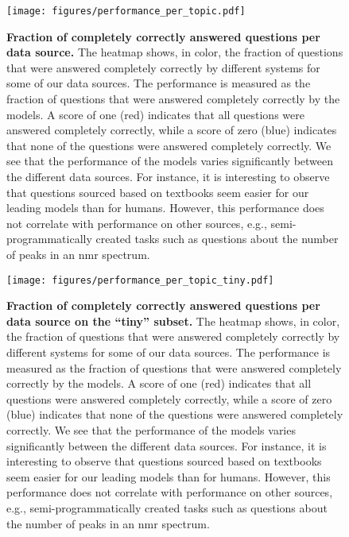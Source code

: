 \begin{figure}[htb]
    \centering
    \texttt{[image: figures/performance\_per\_topic.pdf]}
    \caption{\textbf{Fraction of completely correctly answered questions per data source.} The heatmap shows, in color, the fraction of questions that were answered completely correctly by different systems for some of our data sources. The performance is measured as the fraction of questions that were answered completely correctly by the models. A score of one (red) indicates that all questions were answered completely correctly, while a score of zero (blue) indicates that none of the questions were answered completely correctly.
        We see that the performance of the models varies significantly between the different data sources. For instance, it is interesting to observe that questions sourced based on textbooks seem easier for our leading models than for humans. However, this performance does not correlate with performance on other sources, e.g., semi-programmatically created tasks such as questions about the number of peaks in an \gls{nmr} spectrum.
    }
    \label{fig:performance_per_topic}
\end{figure}



\begin{figure}[htb]
    \centering
    \texttt{[image: figures/performance\_per\_topic\_tiny.pdf]}
    \caption{\textbf{Fraction of completely correctly answered questions per data source on the \enquote{tiny} subset.} The heatmap shows, in color, the fraction of questions that were answered completely correctly by different systems for some of our data sources. The performance is measured as the fraction of questions that were answered completely correctly by the models. A score of one (red) indicates that all questions were answered completely correctly, while a score of zero (blue) indicates that none of the questions were answered completely correctly.
        We see that the performance of the models varies significantly between the different data sources. For instance, it is interesting to observe that questions sourced based on textbooks seem easier for our leading models than for humans. However, this performance does not correlate with performance on other sources, e.g., semi-programmatically created tasks such as questions about the number of peaks in an \gls{nmr} spectrum.
    }
    \label{fig:performance_per_topic_tiny}
\end{figure}




